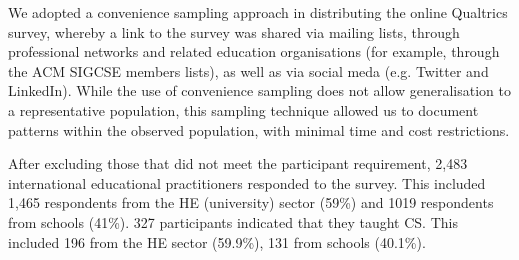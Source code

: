 \documentclass[conference]{IEEEtran}
\begin{document}

We adopted a convenience sampling approach in distributing the online
Qualtrics survey, whereby a link to the survey was shared via mailing
lists, through professional networks and related education
organisations (for example, through the ACM SIGCSE members lists), as
well as via social meda (e.g. Twitter and LinkedIn). While the use of
convenience sampling does not allow generalisation to a representative
population, this sampling technique allowed us to document patterns
within the observed population, with minimal time and cost
restrictions.


After excluding those that did not meet the participant requirement,
2,483 international educational practitioners responded to the
survey. This included 1,465 respondents from the HE (university)
sector (59\%) and 1019 respondents from schools (41\%). 327
participants indicated that they taught CS. This
included 196 from the HE sector (59.9\%), 131 from schools (40.1\%).

\end{document}
